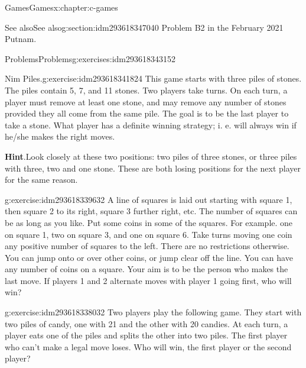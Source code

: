 \documentclass[twoside,10pt,]{book}
\newcommand{\blocktitlefont}{\relax}
\numberwithin{equation}{section}
\begin{document}
\begin{chapterptx}{Games}{}{Games}{}{}{x:chapter:c-games}
%
%
\typeout{************************************************}
\typeout{************************************************}
%
\begin{sectionptx}{See also}{}{See also}{}{}{g:section:idm293618347040}
Problem B2 in the February 2021 Putnam.%
\end{sectionptx}
%
%
\typeout{************************************************}
\typeout{************************************************}
%
\begin{exercises-section}{Problems}{}{Problems}{}{}{g:exercises:idm293618343152}
\begin{divisionexercise}{1}{Nim Piles.}{}{g:exercise:idm293618341824}%
This game starts with three piles of stones. The piles contain 5, 7, and 11 stones. Two players take turns. On each turn, a player must remove at least one stone, and may remove any number of stones provided they all come from the same pile. The goal is to be the last player to take a stone. What player has a definite winning strategy; i. e. will always win if he\slash{}she makes the right moves.%
\par\smallskip%
\noindent\textbf{\blocktitlefont Hint}.\label{g:hint:idm293618340208}{}\hypertarget{g:hint:idm293618340208}{}\quad{}Look closely at these two positions: two piles of three stones, or three piles with three, two and one stone.   These are both losing positions for the next player for the same reason.%
\end{divisionexercise}%
\begin{divisionexercise}{2}{}{}{g:exercise:idm293618339632}%
A line of squares is laid out starting with square 1, then square 2 to its right, square 3 further right, etc.  The number of squares can be as long as you like. Put some coins in some of the squares.  For example.  one on square 1, two on square 3, and one on square 6.  Take turns moving one coin any positive number of squares to the left. There are no restrictions otherwise. You can jump onto or over other coins, or jump clear off the line. You can have any number of coins on a square. Your aim is to be the person who makes the last move.   If players 1 and 2 alternate moves with player 1 going first, who will win?%
\end{divisionexercise}%
\begin{divisionexercise}{3}{}{}{g:exercise:idm293618338032}%
Two players play the following game. They start with two piles of candy, one with 21 and the other with 20 candies. At each turn, a player eats one of the piles and splits the other into two piles. The first player who can't make a legal move loses. Who will win, the first player or the second player?%

\end{divisionexercise}
\end{exercises-section}
\end{chapterptx}
\end{document}
